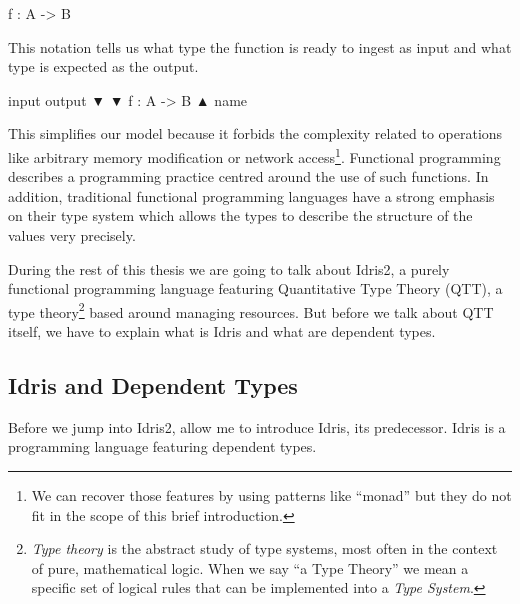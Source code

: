 \documentclass[
]{article}
\newenvironment{Shaded}{}{}
\newcommand{\DataTypeTok}[1]{\textcolor[rgb]{0.56,0.13,0.00}{#1}}
\newcommand{\NormalTok}[1]{#1}
\newcommand{\OperatorTok}[1]{\textcolor[rgb]{0.40,0.40,0.40}{#1}}
\newcommand{\OtherTok}[1]{\textcolor[rgb]{0.00,0.44,0.13}{#1}}
\begin{document}
\begin{Shaded}
\begin{Highlighting}[]
\NormalTok{f }\OperatorTok{:} \DataTypeTok{A} \OtherTok{{-}\textgreater{}} \DataTypeTok{B}
\end{Highlighting}
\end{Shaded}

This notation tells us what type the function is ready to ingest as
input and what type is expected as the output.

\begin{Shaded}
\begin{Highlighting}[]
\NormalTok{input    output}
\NormalTok{    ▼    ▼}
\NormalTok{f }\OperatorTok{:} \DataTypeTok{A} \OtherTok{{-}\textgreater{}} \DataTypeTok{B}
\NormalTok{▲}
\NormalTok{name }
\end{Highlighting}
\end{Shaded}

This simplifies our model because it forbids the complexity related to
operations like arbitrary memory modification or network
access\footnote{We can recover those features by using patterns like
  ``monad'' but they do not fit in the scope of this brief introduction.}.
Functional programming describes a programming practice centred around
the use of such functions. In addition, traditional functional
programming languages have a strong emphasis on their type system which
allows the types to describe the structure of the values very precisely.

During the rest of this thesis we are going to talk about Idris2, a
purely functional programming language featuring Quantitative Type
Theory (QTT), a type theory\footnote{\emph{Type theory} is the abstract
  study of type systems, most often in the context of pure, mathematical
  logic. When we say ``a Type Theory'' we mean a specific set of logical
  rules that can be implemented into a \emph{Type System}.} based around
managing resources. But before we talk about QTT itself, we have to
explain what is Idris and what are dependent types.

\hypertarget{idris-and-dependent-types}{%
\subsection{Idris and Dependent Types}\label{idris-and-dependent-types}}

Before we jump into Idris2, allow me to introduce Idris\cite{idris1},
its predecessor. Idris is a programming language featuring dependent
types.
\end{document}
